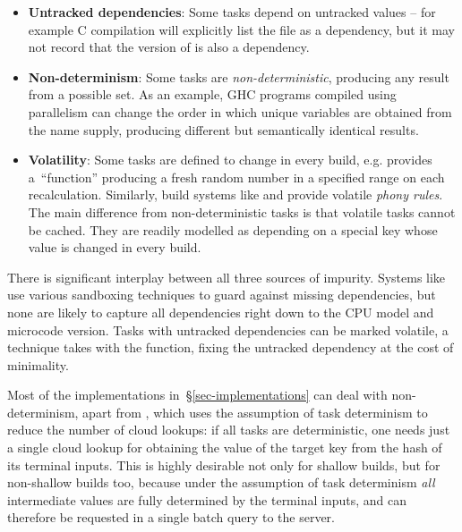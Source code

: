 \begin{itemize}
\item \textbf{Untracked dependencies}: Some tasks depend on untracked values --
      for example C compilation will explicitly list the  file as
      a dependency, but it may not record that the version of  is also
      a dependency.

\item \textbf{Non-determinism}: Some tasks are \emph{non-deterministic},
      producing any result from a possible set. As an example, GHC programs
      compiled using parallelism can change the order in which unique variables
      are obtained from the name supply, producing different but semantically
      identical results.

\item \textbf{Volatility}: Some tasks are defined to change in every build, e.g.
      \Excel provides a~``function''  producing a fresh random
      number in a specified range on each recalculation. Similarly, build
      systems like \Make and \Shake provide volatile \emph{phony rules}. The
      main difference from non-deterministic tasks is that volatile tasks cannot
      be cached. They are readily modelled as depending on a special key
       whose value is changed in every build.
\end{itemize}

There is significant interplay between all three sources of
impurity. Systems like \Bazel use various sandboxing techniques to guard against
missing dependencies, but none are likely to capture all dependencies right down
to the CPU model and microcode version. Tasks with untracked dependencies can be
marked volatile, a technique \Excel takes with the  function,
fixing the untracked dependency at the cost of minimality.

Most of the implementations in~\S\ref{sec-implementations} can deal with
non-determinism, apart from \Buck, which uses the assumption of task determinism
to reduce the number of cloud lookups: if all tasks are deterministic, one needs
just a single cloud lookup for obtaining the value of the target key from the
hash of its terminal inputs. This is highly desirable not only for shallow
builds, but for non-shallow builds too, because under the assumption of task
determinism \emph{all} intermediate values are fully determined by the terminal
inputs, and can therefore be requested in a single batch query to the server.

